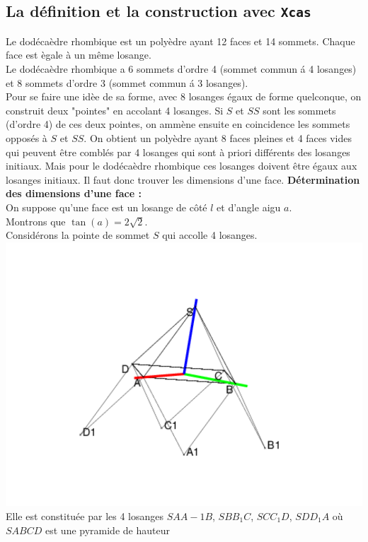 \documentclass[a4paper,11pt]{book}
\begin{document}
\subsection{La d\'efinition et la construction avec {\tt Xcas}}
Le dod\'eca\`edre rhombique est un poly\`edre ayant 12 faces et 14 sommets. 
Chaque face est \`egale \`a un m\^eme losange.\\
Le dod\'eca\`edre  rhombique a 6 sommets d'ordre 4 (sommet commun \'a 4 
losanges) et 8 sommets d'ordre 3 (sommet commun \'a 3 losanges).\\
Pour se faire une id\`ee de sa forme, avec 8 losanges \'egaux de forme 
quelconque, on construit deux "pointes" en accolant 4 losanges. Si $S$ et $SS$ 
sont les sommets (d'ordre 4) de ces deux pointes, on amm\`ene ensuite en 
coincidence les sommets oppos\'es \`a $S$ et $SS$.
On obtient un poly\`edre ayant 8 faces pleines et 4 faces vides qui peuvent 
\^etre combl\'es par 4 losanges qui sont \`a priori diff\'erents des losanges 
initiaux. Mais pour le dod\'eca\`edre rhombique ces losanges doivent \^etre 
\'egaux aux losanges initiaux. Il faut donc trouver les dimensions d'une face.
{\bf D\'etermination des dimensions d'une face :}\\
On suppose qu'une face est un losange de c\^ot\'e $l$ et d'angle aigu $a$.\\
Montrons que $\tan(a)=2\sqrt 2$.\\
Consid\'erons la pointe de sommet $S$ qui accolle 4 losanges. \\
\includegraphics[width=\textwidth]{doderhomb}\\
Elle est constitu\'ee par les 4 losanges 
$SAA-1B$, $SBB_1C$, $SCC_1D$, $SDD_1A$ o\`u $SABCD$ est une pyramide de hauteur
\end{document}
